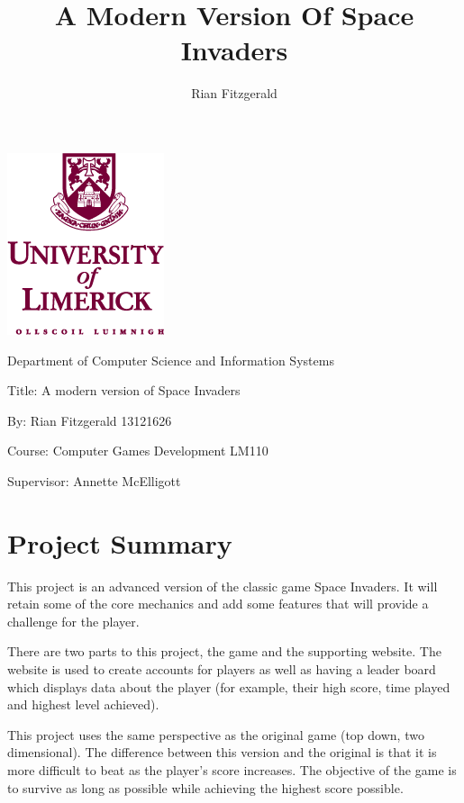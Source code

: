\documentclass[12pt]{article}
\title{A Modern Version Of Space Invaders}
\author{Rian Fitzgerald}
\begin{document}
\newpage

\begin{center}
\section*{}
	\includegraphics[scale=1]{uni-limerick-crest.png}
	
	{\Large Department of Computer Science and Information Systems
	
	\vspace{5em}
	Title: A modern version of Space Invaders
	
	By: Rian Fitzgerald 13121626
	
	Course: Computer Games Development LM110
	
	Supervisor: Annette McElligott}
	
\end{center}
\newpage
{}
\section*{Project Summary}
This project is an advanced version of the classic game Space Invaders. It will retain some of the core mechanics and add some features that will provide a challenge for the player. 

There are two parts to this project, the game and the supporting website. The website is used to create accounts for players as well as having a leader board which displays data about the player (for example, their high score, time played and highest level achieved). 

This project uses the same perspective as the original game (top down, two dimensional). The difference between this version and the original is that it is more difficult to beat as the player's score increases. The objective of the game is to survive as long as possible while achieving the highest score possible. 
\end{document}
